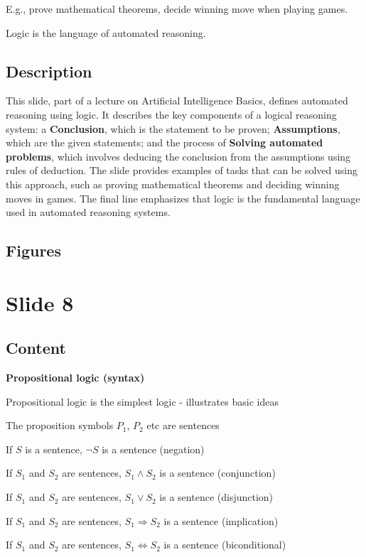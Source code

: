 \documentclass{article}%
\begin{document}
E.g., prove mathematical theorems, decide winning move when playing games.

Logic is the language of automated reasoning.
%
\subsection{Description}%
This slide, part of a lecture on Artificial Intelligence Basics, defines automated reasoning using logic.  It describes the key components of a logical reasoning system:  a \textbf{Conclusion}, which is the statement to be proven; \textbf{Assumptions}, which are the given statements; and the process of \textbf{Solving automated problems}, which involves deducing the conclusion from the assumptions using rules of deduction.  The slide provides examples of tasks that can be solved using this approach, such as proving mathematical theorems and deciding winning moves in games.  The final line emphasizes that logic is the fundamental language used in automated reasoning systems.%
\subsection{Figures}%
\begin{figure}[H]%
\centering%
\end{figure}

%
\newpage%
\section{Slide 8}%
\label{sec:Slide8}%
\subsection{Content}%

\textbf{Propositional logic (syntax)}

Propositional logic is the simplest logic - illustrates basic ideas

The proposition symbols $P_1$, $P_2$ etc are sentences

If $S$ is a sentence, $\neg S$ is a sentence (negation)

If $S_1$ and $S_2$ are sentences, $S_1 \land S_2$ is a sentence (conjunction)

If $S_1$ and $S_2$ are sentences, $S_1 \lor S_2$ is a sentence (disjunction)

If $S_1$ and $S_2$ are sentences, $S_1 \Rightarrow S_2$ is a sentence (implication)

If $S_1$ and $S_2$ are sentences, $S_1 \Leftrightarrow S_2$ is a sentence (biconditional)
%
\end{document}
